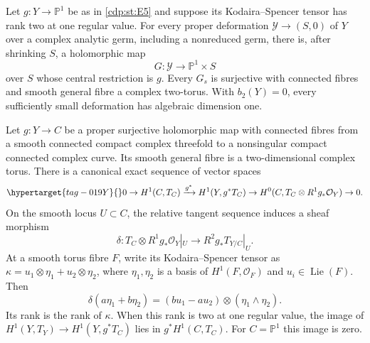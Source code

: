 \begin{proposition}\hypertarget{tag-01GV}{}\label{cdp:st:E6}


Let $g:Y\to\mathbb P^1$ be as in \ref{cdp:st:E5} and suppose its
Kodaira--Spencer tensor has rank two at one regular value. For every
proper deformation $\mathcal Y\to(S,0)$ of $Y$ over a complex
analytic germ, including a nonreduced germ, there is, after shrinking
$S$, a holomorphic map
\[
 G:\mathcal Y\longrightarrow\mathbb P^1\times S
\]
over $S$ whose central restriction is $g$. Every $G_s$ is surjective
with connected fibres and smooth general fibre a complex two-torus.
With $b_2(Y)=0$, every sufficiently small deformation has algebraic
dimension one.
\end{proposition}

\begin{proposition}\hypertarget{tag-01GU}{}\label{cdp:st:E5}


Let $g:Y\to C$ be a proper surjective holomorphic map with connected fibres
from a smooth connected compact complex threefold to a nonsingular compact
connected complex curve. Its smooth general fibre is a two-dimensional complex
torus. There is a canonical exact sequence of vector spaces
\begin{equation}\hypertarget{tag-019Y}{}\label{cdp:eq:E-Leray-map}
0\to H^1(C,T_C)\xrightarrow{g^*}H^1(Y,g^*T_C)
 \to H^0(C,T_C\otimes R^1g_*\mathcal O_Y)\to0.
\end{equation}
On the smooth locus $U\subset C$, the relative tangent sequence
induces a sheaf morphism
\[
 \delta:T_C\otimes R^1g_*\mathcal O_Y|_U
                  \longrightarrow R^2g_*T_{Y/C}|_U.
\]
At a smooth torus fibre $F$, write its Kodaira--Spencer tensor as
$\kappa=u_1\otimes\eta_1+u_2\otimes\eta_2$, where
$\eta_1,\eta_2$ is a basis of $H^1(F,\mathcal O_F)$ and
$u_i\in\operatorname{Lie}(F)$. Then
\[
 \delta(a\eta_1+b\eta_2)
   =(bu_1-au_2)\otimes(\eta_1\wedge\eta_2).
\]
Its rank is the rank of $\kappa$. When this rank is two at one
regular value, the image of $H^1(Y,T_Y)\to H^1(Y,g^*T_C)$ lies
in $g^*H^1(C,T_C)$. For $C=\mathbb P^1$ this image is zero.
\end{proposition}

